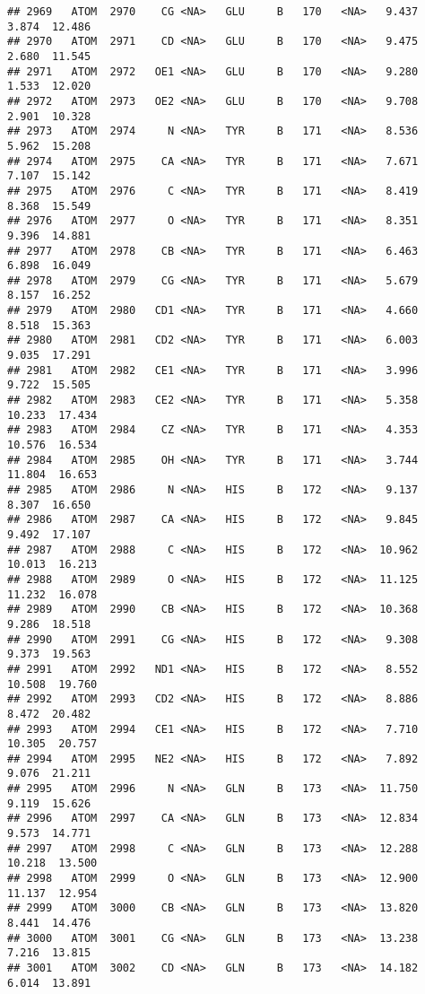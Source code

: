 \documentclass[
]{article}
\begin{document}
\begin{verbatim}
## 2969   ATOM  2970    CG <NA>   GLU     B   170   <NA>   9.437   3.874  12.486
## 2970   ATOM  2971    CD <NA>   GLU     B   170   <NA>   9.475   2.680  11.545
## 2971   ATOM  2972   OE1 <NA>   GLU     B   170   <NA>   9.280   1.533  12.020
## 2972   ATOM  2973   OE2 <NA>   GLU     B   170   <NA>   9.708   2.901  10.328
## 2973   ATOM  2974     N <NA>   TYR     B   171   <NA>   8.536   5.962  15.208
## 2974   ATOM  2975    CA <NA>   TYR     B   171   <NA>   7.671   7.107  15.142
## 2975   ATOM  2976     C <NA>   TYR     B   171   <NA>   8.419   8.368  15.549
## 2976   ATOM  2977     O <NA>   TYR     B   171   <NA>   8.351   9.396  14.881
## 2977   ATOM  2978    CB <NA>   TYR     B   171   <NA>   6.463   6.898  16.049
## 2978   ATOM  2979    CG <NA>   TYR     B   171   <NA>   5.679   8.157  16.252
## 2979   ATOM  2980   CD1 <NA>   TYR     B   171   <NA>   4.660   8.518  15.363
## 2980   ATOM  2981   CD2 <NA>   TYR     B   171   <NA>   6.003   9.035  17.291
## 2981   ATOM  2982   CE1 <NA>   TYR     B   171   <NA>   3.996   9.722  15.505
## 2982   ATOM  2983   CE2 <NA>   TYR     B   171   <NA>   5.358  10.233  17.434
## 2983   ATOM  2984    CZ <NA>   TYR     B   171   <NA>   4.353  10.576  16.534
## 2984   ATOM  2985    OH <NA>   TYR     B   171   <NA>   3.744  11.804  16.653
## 2985   ATOM  2986     N <NA>   HIS     B   172   <NA>   9.137   8.307  16.650
## 2986   ATOM  2987    CA <NA>   HIS     B   172   <NA>   9.845   9.492  17.107
## 2987   ATOM  2988     C <NA>   HIS     B   172   <NA>  10.962  10.013  16.213
## 2988   ATOM  2989     O <NA>   HIS     B   172   <NA>  11.125  11.232  16.078
## 2989   ATOM  2990    CB <NA>   HIS     B   172   <NA>  10.368   9.286  18.518
## 2990   ATOM  2991    CG <NA>   HIS     B   172   <NA>   9.308   9.373  19.563
## 2991   ATOM  2992   ND1 <NA>   HIS     B   172   <NA>   8.552  10.508  19.760
## 2992   ATOM  2993   CD2 <NA>   HIS     B   172   <NA>   8.886   8.472  20.482
## 2993   ATOM  2994   CE1 <NA>   HIS     B   172   <NA>   7.710  10.305  20.757
## 2994   ATOM  2995   NE2 <NA>   HIS     B   172   <NA>   7.892   9.076  21.211
## 2995   ATOM  2996     N <NA>   GLN     B   173   <NA>  11.750   9.119  15.626
## 2996   ATOM  2997    CA <NA>   GLN     B   173   <NA>  12.834   9.573  14.771
## 2997   ATOM  2998     C <NA>   GLN     B   173   <NA>  12.288  10.218  13.500
## 2998   ATOM  2999     O <NA>   GLN     B   173   <NA>  12.900  11.137  12.954
## 2999   ATOM  3000    CB <NA>   GLN     B   173   <NA>  13.820   8.441  14.476
## 3000   ATOM  3001    CG <NA>   GLN     B   173   <NA>  13.238   7.216  13.815
## 3001   ATOM  3002    CD <NA>   GLN     B   173   <NA>  14.182   6.014  13.891

\end{verbatim}
\end{document}
